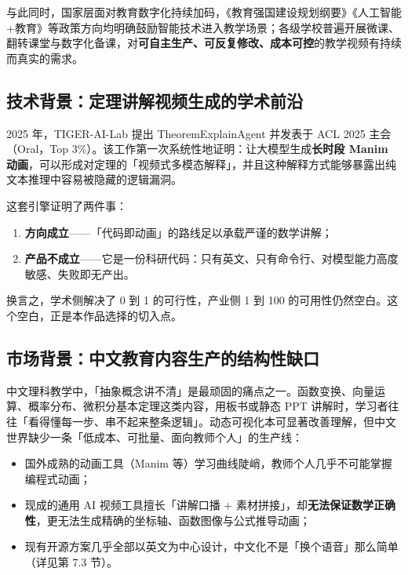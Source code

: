\documentclass[11pt,a4paper]{ctexart}
\begin{document}
与此同时，国家层面对教育数字化持续加码，《教育强国建设规划纲要》《人工智能+教育》等政策方向均明确鼓励智能技术进入教学场景；各级学校普遍开展微课、翻转课堂与数字化备课，对\textbf{可自主生产、可反复修改、成本可控}的教学视频有持续而真实的需求。

\subsection{技术背景：定理讲解视频生成的学术前沿}

2025 年，TIGER-AI-Lab 提出 TheoremExplainAgent 并发表于 ACL 2025 主会（Oral，Top 3\%）。该工作第一次系统性地证明：让大模型生成\textbf{长时段 Manim 动画}，可以形成对定理的「视频式多模态解释」，并且这种解释方式能够暴露出纯文本推理中容易被隐藏的逻辑漏洞。

这套引擎证明了两件事：

\begin{enumerate}
  \item \textbf{方向成立}——「代码即动画」的路线足以承载严谨的数学讲解；
  \item \textbf{产品不成立}——它是一份科研代码：只有英文、只有命令行、对模型能力高度敏感、失败即无产出。
\end{enumerate}

换言之，学术侧解决了 0 到 1 的可行性，产业侧 1 到 100 的可用性仍然空白。这个空白，正是本作品选择的切入点。

\subsection{市场背景：中文教育内容生产的结构性缺口}

中文理科教学中，「抽象概念讲不清」是最顽固的痛点之一。函数变换、向量运算、概率分布、微积分基本定理这类内容，用板书或静态 PPT 讲解时，学习者往往「看得懂每一步、串不起来整条逻辑」。动态可视化本可显著改善理解，但中文世界缺少一条「低成本、可批量、面向教师个人」的生产线：

\begin{itemize}
  \item 国外成熟的动画工具（Manim 等）学习曲线陡峭，教师个人几乎不可能掌握编程式动画；
  \item 现成的通用 AI 视频工具擅长「讲解口播 + 素材拼接」，却\textbf{无法保证数学正确性}，更无法生成精确的坐标轴、函数图像与公式推导动画；
  \item 现有开源方案几乎全部以英文为中心设计，中文化不是「换个语音」那么简单（详见第 7.3 节）。
\end{itemize}
\end{document}
